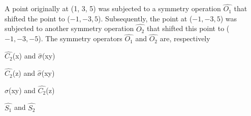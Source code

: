 \item A point originally at (1, 3, 5) was subjected to a symmetry operation $\hat{O_1}$ that
shifted the point to ($-1, -3, 5$). Subsequently, the point at ($-1, -3, 5$) was
subjected to another symmetry operation $\hat{O_2}$ that shifted this point to
($-1, -3, -5$). The symmetry operators $\hat{O_1}$ and $\hat{O_2}$ are, respectively

\begin{enumerate} \begin{multicols}{2}
\item $\hat{C_2}$(x) and $\hat{\sigma}$(xy)
\item $\hat{C_2}$(z) and $\hat{\sigma}$(xy)
\item $\hat{\sigma}$(xy) and $\hat{C_2}$(z)
\item $\hat{S_1}$ and $\hat{S_2}$
\end{multicols}
\end{enumerate}    

